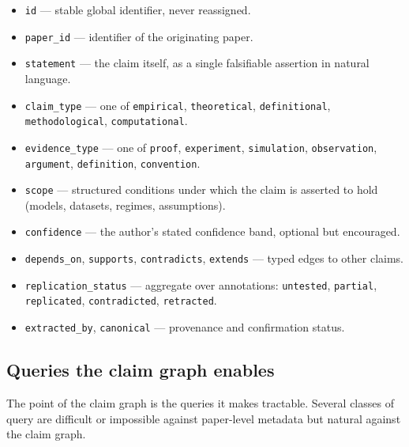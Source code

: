 \documentclass[11pt]{rrxiv}
\begin{document}
\begin{itemize}[leftmargin=2em]
\item \texttt{id} --- stable global identifier, never reassigned.
\item \texttt{paper\_id} --- identifier of the originating paper.
\item \texttt{statement} --- the claim itself, as a single falsifiable assertion in natural language.
\item \texttt{claim\_type} --- one of \texttt{empirical}, \texttt{theoretical}, \texttt{definitional}, \texttt{methodological}, \texttt{computational}.
\item \texttt{evidence\_type} --- one of \texttt{proof}, \texttt{experiment}, \texttt{simulation}, \texttt{observation}, \texttt{argument}, \texttt{definition}, \texttt{convention}.
\item \texttt{scope} --- structured conditions under which the claim is asserted to hold (models, datasets, regimes, assumptions).
\item \texttt{confidence} --- the author's stated confidence band, optional but encouraged.
\item \texttt{depends\_on}, \texttt{supports}, \texttt{contradicts}, \texttt{extends} --- typed edges to other claims.
\item \texttt{replication\_status} --- aggregate over annotations: \texttt{untested}, \texttt{partial}, \texttt{replicated}, \texttt{contradicted}, \texttt{retracted}.
\item \texttt{extracted\_by}, \texttt{canonical} --- provenance and confirmation status.
\end{itemize}

\subsection{Queries the claim graph enables}

The point of the claim graph is the queries it makes tractable. Several classes of query are difficult or impossible against paper-level metadata but natural against the claim graph.
\end{document}
